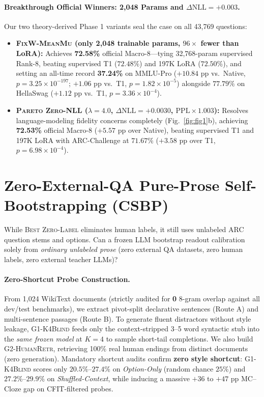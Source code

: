 \documentclass[10pt,twocolumn]{article}
\begin{document}
\paragraph{Breakthrough Official Winners: 2,048 Params and $\Delta\mathrm{NLL}=+0.003$.}
Our two theory-derived Phase 1 variants seal the case on all 43,769 questions:
\begin{itemize}
\item \textbf{\textsc{FixW-MeanMu} (only 2,048 trainable params, $96\times$ fewer than LoRA):} Achieves \textbf{72.58\%} official Macro-8---tying 32,768-param supervised Rank-8, beating supervised T1 ($72.48\%$) and 197K LoRA ($72.50\%$), and setting an all-time record \textbf{37.24\%} on MMLU-Pro ($+10.84$ pp vs.\ Native, $p=3.25\times 10^{-197}$; $+1.06$ pp vs.\ T1, $p=1.82\times 10^{-5}$) alongside $77.79\%$ on HellaSwag ($+1.12$ pp vs.\ T1, $p=3.36\times 10^{-4}$).
\item \textbf{\textsc{Pareto Zero-NLL} ($\lambda=4.0$, $\Delta\mathrm{NLL}=+0.0030$, $\mathrm{PPL}\times 1.003$):} Resolves language-modeling fidelity concerns completely (Fig.~\ref{fig:fig1}b), achieving \textbf{72.53\%} official Macro-8 ($+5.57$ pp over Native), beating supervised T1 and 197K LoRA with ARC-Challenge at $71.67\%$ ($+3.58$ pp over T1, $p=6.98\times 10^{-4}$).
\end{itemize}

\section{Zero-External-QA Pure-Prose Self-Bootstrapping (CSBP)}
\label{sec:csbp}

While \textsc{Best Zero-Label} eliminates human labels, it still uses unlabeled ARC question stems and options. Can a frozen LLM bootstrap readout calibration solely from \emph{ordinary unlabeled prose} (zero external QA datasets, zero human labels, zero external teacher LLMs)?

\paragraph{Zero-Shortcut Probe Construction.}
From 1,024 WikiText documents (strictly audited for \textbf{0} 8-gram overlap against all dev/test benchmarks), we extract pivot-split declarative sentences (Route A) and multi-sentence passages (Route B). To generate fluent distractors without style leakage, \textsc{G1-K4Blind} feeds only the context-stripped 3--5 word syntactic stub into the \emph{same frozen model} at $K=4$ to sample short-tail completions. We also build \textsc{G2-HumanRetr}, retrieving 100\% real human endings from distinct documents (zero generation).
Mandatory shortcut audits confirm \textbf{zero style shortcut}: \textsc{G1-K4Blind} scores only $20.5\%$--$27.4\%$ on \emph{Option-Only} (random chance $25\%$) and $27.2\%$--$29.9\%$ on \emph{Shuffled-Context}, while inducing a massive $+36$ to $+47$ pp MC--Cloze gap on CFIT-filtered probes.
\end{document}
